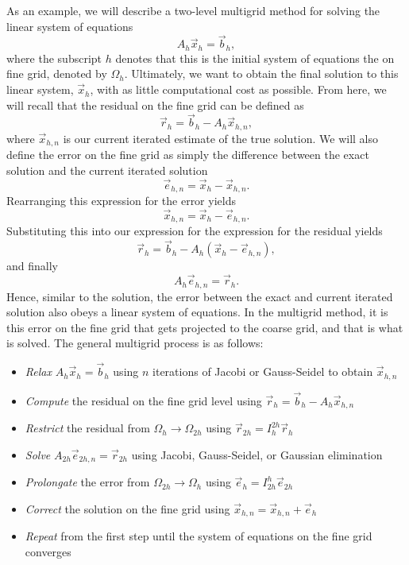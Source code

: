 As an example, we will describe a two-level multigrid method for solving the linear system of equations
\begin{equation}
	A_h \vec{x}_h = \vec{b}_h,
\end{equation}
where the subscript $h$ denotes that this is the initial system of equations the on fine grid, denoted by $\Omega_h$. Ultimately, we want to obtain the final solution to this linear system, $\vec{x}_h$, with as little computational cost as possible. From here, we will recall that the residual on the fine grid can be defined as
\begin{equation}
	\vec{r}_h = \vec{b}_h - A_h \vec{x}_{h,n},
\end{equation}
where $\vec{x}_{h,n}$ is our current iterated estimate of the true solution. We will also define the error on the fine grid as simply the difference between the exact solution and the current iterated solution
\begin{equation}
	\vec{e}_{h,n} = \vec{x}_{h} - \vec{x}_{h,n}.
\end{equation}
Rearranging this expression for the error yields
\begin{equation}
	\vec{x}_{h,n} =  \vec{x}_{h} - \vec{e}_{h,n}.
\end{equation}
Substituting this into our expression for the expression for the residual yields
\begin{equation}
	\vec{r}_h = \vec{b}_h - A_h (\vec{x}_{h} - \vec{e}_{h,n}),
\end{equation}
and finally
\begin{equation}
	A_h \vec{e}_{h,n} = \vec{r}_h.
\end{equation}
Hence, similar to the solution, the error between the exact and current iterated solution also obeys a linear system of equations. In the multigrid method, it is this error on the fine grid that gets projected to the coarse grid, and that is what is solved. The general multigrid process is as follows:
\begin{itemize}
	\item {\it Relax} $A_h \vec{x}_h = \vec{b}_h$ using $n$ iterations of Jacobi or Gauss-Seidel to obtain $\vec{x}_{h,n}$
	\item {\it Compute} the residual on the fine grid level using $\vec{r}_h = \vec{b}_h - A_h \vec{x}_{h,n}$
	\item {\it Restrict} the residual from $\Omega_h \rightarrow \Omega_{2h}$ using $\vec{r}_{2h} = I_{h}^{2h} \vec{r}_h$
	\item {\it Solve} $A_{2h} \vec{e}_{2h,n} = \vec{r}_{2h}$ using Jacobi, Gauss-Seidel, or Gaussian elimination
	\item {\it Prolongate} the error from $\Omega_{2h} \rightarrow \Omega_{h}$ using $\vec{e}_{h} = I_{2h}^{h} \vec{e}_{2h}$
	\item {\it Correct} the solution on the fine grid using $\vec{x}_{h,n} = \vec{x}_{h,n} + \vec{e}_{h}$
	\item {\it Repeat} from the first step until the system of equations on the fine grid converges
\end{itemize}
